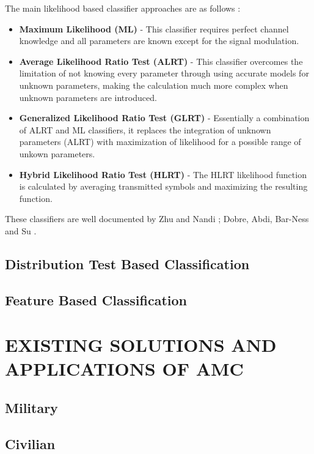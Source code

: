 \documentclass[10pt,twocolumn]{witseiepaper}
\begin{document}
	The main likelihood based classifier approaches are as follows \cite{zhu2014automatic}:
	\begin{itemize}
		\item \textbf{Maximum Likelihood (ML)} - This classifier requires perfect channel knowledge and all parameters are known except for the signal modulation.
		\item \textbf{Average Likelihood Ratio Test (ALRT)} - This classifier overcomes the limitation of not knowing every parameter through using accurate models for unknown parameters, making the calculation much more complex when unknown parameters are introduced.
		\item \textbf{Generalized Likelihood Ratio Test (GLRT)} - Essentially a combination of ALRT and ML classifiers, it replaces the integration of unknown parameters (ALRT) with maximization of likelihood for a possible range of unkown parameters.
		\item \textbf{Hybrid Likelihood Ratio Test (HLRT)} - The HLRT likelihood function is calculated by averaging transmitted symbols and maximizing the resulting function.
	\end{itemize}
	These classifiers are well documented by Zhu and Nandi \cite{zhu2014automatic}; Dobre, Abdi, Bar-Ness and Su \cite{dobre2007survey}. 

	\subsection{Distribution Test Based Classification}
	\label{subsec:distribution}

	\subsection{Feature Based Classification}
	\label{subsec:feature}


\section{EXISTING SOLUTIONS AND APPLICATIONS OF AMC}
	\subsection{Military}
	\subsection{Civilian}
\end{document}
